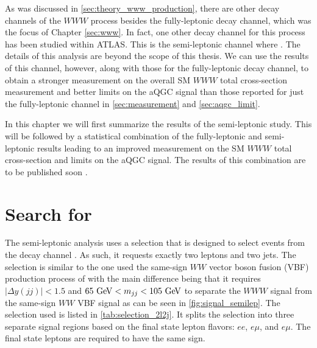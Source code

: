 
As was discussed in \sec\ref{sec:theory_www_production}, there are other decay
channels of the $WWW$ process besides the fully-leptonic decay channel,
which was the focus of Chapter \ref{sec:www}.  
In fact, one other decay channel for this process has been studied within 
ATLAS. This is the semi-leptonic channel where \wwwlljj. The details of this 
analysis are beyond the scope of this thesis. We can use the results of this channel,
however, along with those for the fully-leptonic decay channel, to obtain a stronger measurement
on the overall SM $WWW$ total cross-section measurement and better 
limits on the aQGC signal than
those reported for just the fully-leptonic 
channel in \sec\ref{sec:measurement} and \sec\ref{sec:aqgc_limit}. 


In this chapter we will first summarize the results of the semi-leptonic study. 
This will be followed by a statistical combination of the fully-leptonic and semi-leptonic
results leading to an improved  
measurement on the SM $WWW$ total cross-section and limits on the 
aQGC signal.
The results of this combination are to be published soon \cite{wwwcomb}.




\section{Search for \wwwlljj}
\label{sec:semilep}


The semi-leptonic analysis uses a selection that is designed
to select events from the decay channel \wwwlljj. As such, 
it requests exactly two leptons and two jets.  The selection is similar
to the one used the same-sign $WW$ vector boson fusion (VBF) production process of
\cite{PhysRevLett.113.141803} with the main difference being that
it requires $|\Delta y(jj)| < 1.5$ and $65 \GeV < m_{jj} < 105 \GeV$
to separate the $WWW$ signal from the same-sign $WW$ VBF signal as can be
seen in \fig\ref{fig:signal_semilep}. The selection used is listed in \tab\ref{tab:selection_2l2j}.
It splits the selection into three separate signal regions based on the final
state lepton flavors: $ee$, $e\mu$, and $e\mu$. The final state leptons
are required to have the same sign.

%


